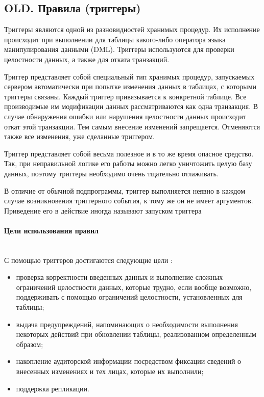 \subsection{OLD. Правила (триггеры)}
Триггеры являются одной из разновидностей хранимых процедур. Их исполнение происходит при выполнении для таблицы какого-либо оператора языка манипулирования данными (DML). Триггеры используются для проверки целостности данных, а также для отката транзакций.


Триггер представляет собой специальный тип хранимых процедур, запускаемых сервером автоматически при попытке изменения данных в таблицах, с которыми триггеры связаны. Каждый триггер привязывается к конкретной таблице. Все производимые им модификации данных рассматриваются как одна транзакция. В случае обнаружения ошибки или нарушения целостности данных происходит откат этой транзакции. Тем самым внесение изменений запрещается. Отменяются также все изменения, уже сделанные триггером.


Триггер представляет собой весьма полезное и в то же время опасное средство. Так, при неправильной логике его работы можно легко уничтожить целую базу данных, поэтому триггеры необходимо очень тщательно отлаживать.


В отличие от обычной подпрограммы, триггер выполняется неявно в каждом случае возникновения триггерного события, к тому же он не имеет аргументов. Приведение его в действие иногда называют запуском триггера \autocite{IntuitTrigg}

\paragraph{Цели использования правил} ~\\

С помощью триггеров достигаются следующие цели \autocite{IntuitTrigg}:
\begin{itemize}
    \item проверка корректности введенных данных и выполнение сложных ограничений целостности данных, которые трудно, если вообще возможно, поддерживать с помощью ограничений целостности, установленных для таблицы;
    \item выдача предупреждений, напоминающих о необходимости выполнения некоторых действий при обновлении таблицы, реализованном определенным образом;
    \item накопление аудиторской информации посредством фиксации сведений о внесенных изменениях и тех лицах, которые их выполнили;
    \item поддержка репликации.
\end{itemize}

